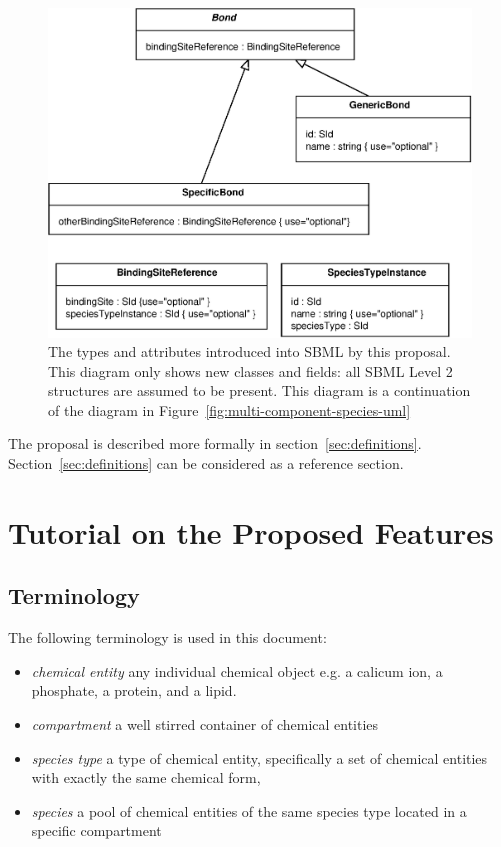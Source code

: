 \documentclass{cekarticle}
\begin{document}
\begin{figure}[h]
  \vspace*{8pt}
  \centering
  \includegraphics[scale = 0.7]{multi-component-species-uml2.eps}
  \caption{The types and attributes introduced into SBML by this proposal.  This diagram
  only shows new classes and fields: all SBML Level 2 structures are assumed to be present.
  This diagram is a continuation of the diagram in Figure~\ref{fig:multi-component-species-uml}}
  \label{fig:multi-component-species-uml2}
\end{figure}

The proposal is described more formally in section~\ref{sec:definitions}.
Section~\ref{sec:definitions} can be considered as a reference section.

\clearpage

\section{Tutorial on the Proposed Features}
\label{sec:tutorial}

\subsection{Terminology}

The following terminology is used in this document:
\begin{itemize}
\item \emph{chemical entity} any individual chemical object
  e.g. a calicum ion, a phosphate, a protein, and a lipid.

\item \emph{compartment} a well stirred container of chemical entities

\item \emph{species type} a type of chemical entity,
  specifically a set of chemical entities with exactly the same chemical form,

\item \emph{species} a pool of chemical entities of the same species type located in a
  specific compartment
\end{itemize}
\end{document}
